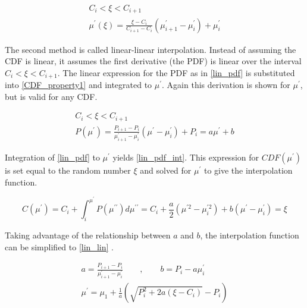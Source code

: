  \begin{equation}
\label{histo_interp}
\begin{gathered}
C_i < \xi < C_{i+1} \\
 \mu^\prime(\xi) = \frac{\xi-C_i}{C_{i+1}-C_i}(\mu^\prime_{i+1}-\mu^\prime_i) + \mu^\prime_i
\end{gathered}
\end{equation}

The second method is called linear-linear interpolation.  Instead of assuming the CDF is linear, it assumes the first derivative (the PDF) is linear over the interval $C_i < \xi < C_{i+1}$.  The linear expression for the PDF as in \eqref{lin_pdf} is substituted into \eqref{CDF_property1} and integrated to $\mu^\prime$.  Again this derivation is shown for $\mu^\prime$, but is valid for any CDF.

\begin{equation}
\label{lin_pdf}
\begin{gathered}
C_i < \xi < C_{i+1} \\
P(\mu^\prime) = \frac{P_{i+1}-P_i}{\mu^\prime_{i+1}-\mu^\prime_i}(\mu^\prime - \mu^\prime_i) + P_i = a \mu^\prime + b
\end{gathered}
\end{equation}

Integration of \eqref{lin_pdf} to $\mu^\prime$ yields \eqref{lin_pdf_int}.  This expression for $CDF(\mu^\prime)$ is set equal to the random number $\xi$ and solved for $\mu^\prime$ to give the interpolation function.

\begin{equation}
\label{lin_pdf_int}
C(\mu^\prime) = C_i  + \int_i^{\mu^\prime} P(\mu^{\prime\prime}) d\mu^{\prime\prime}  = C_i  + \frac{a}{2}(\mu^{\prime 2}-\mu^{\prime 2}_i) + b(\mu^\prime-\mu^\prime_i) = \xi 
\end{equation}

Taking advantage of the relationship between $a$ and $b$, the interpolation function can be simplified to \eqref{lin_lin} \cite{openmc}.

\begin{equation}
\label{lin_lin}
\begin{gathered}
a = \frac{P_{i+1}-P_i}{\mu^\prime_{i+1}-\mu^\prime_i} \qquad , \qquad b = P_i - a \mu^\prime_i \\
\mu^\prime = \mu_1 + \frac{1}{a}\left( \sqrt{P^2_i + 2a(\xi -C_i)} -P_i \right)
\end{gathered}
\end{equation}

